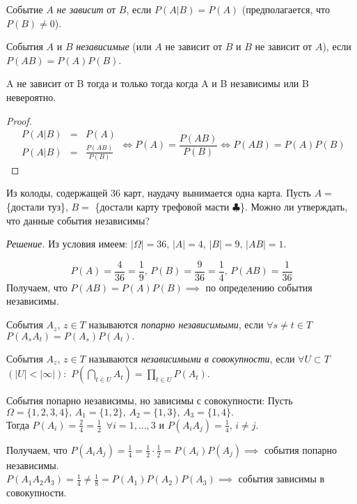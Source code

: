 \begin{definition}\label{lect04:def1}
	Событие $A$ \textit{не зависит} от $B$, если $P(A \vert B) = P(A)$ (предполагается, что $P(B) \neq 0$).
\end{definition}
\begin{definition}\label{lect04:def2}
	События $A$ и $B$ \textit{независимые} (или $A$ не зависит от $B$ и  $B$ не зависит от $A$), если $P(AB) = P(A)P(B)$.
\end{definition}

\begin{prop}\label{lect04:prop1}
	A не зависит от B тогда и только тогда когда A и B независимы или B невероятно.
\end{prop}
\begin{proof}
	$$
	\begin{array}{rcl}
	P(A \vert B) & = &  P(A) \\
	P(A \vert B)  & = & \frac{P(AB)}{P(B)} 
	\end{array} \iff P(A) = \frac{P(AB) }{P(B)} \iff P(AB) = P(A)P(B) $$
\end{proof}


\begin{example}\label{lect04:ex3}
	Из колоды, содержащей 36 карт, наудачу вынимается одна карта. 
	Пусть $A =$ \{достали туз\},  $B =$ \{достали карту трефовой масти $\clubsuit$\}.  Можно ли утверждать, что данные события независимы?
	
	
	\textit{Решение.}
	Из условия имеем: $|\Omega| = 36, \, |A| = 4, \, |B| = 9, \, |AB| = 1$.
	
	$$P(A) = \frac{4}{36} = \frac{1}{9}, \, P(B) = \frac{9}{36} = \frac{1}{4}, \, P(AB) = \frac{1}{36}$$
	Получаем, что $P(AB) = P(A)P(B) \implies$ по определению события независимы.
\end{example}
\begin{definition}\label{lect04:def3}
	События $A_z, \, z \in T$ называются \textit{попарно независимыми}, если $\forall s \neq t \in T$ $P(A_sA_t) = P(A_s)P(A_t).$
\end{definition}
\begin{definition}\label{lect04:def4}
	События $A_z, \, z \in T$ называются \textit{независимыми в совокупности}, если $\forall U \subset T$ $(|U| < |\infty|):$ $P(\bigcap \limits_{t\in U} A_t) = \prod \limits_{t\in U} P(A_t).$     
	
\end{definition}

\begin{example}\label{lect04:ex4}События попарно независимы, но зависимы с совокупности:
	Пусть $\Omega = \{1, 2, 3, 4\}, \, A_1 = \{1, 2\}, \, A_2 = \{1, 3\}, \, A_3 = \{1, 4\}.$\\
	Тогда $P(A_i) = \frac{2}{4} = \frac{1}{2}\,$ $\forall i = 1, \dots , 3$ и $P(A_iA_j) = \frac{1}{4}, \, i \neq j$.
	
	Получаем, что $P(A_iA_j) = \frac{1}{4} = \frac{1}{2} \cdot \frac{1}{2} = P(A_i)P(A_j) \implies$ события попарно независимы.\\
	$P(A_1A_2A_3) = \frac{1}{4} \neq \frac{1}{8} = P(A_1)P(A_2)P(A_3) \implies$ события зависимы в совокупности.
\end{example}

